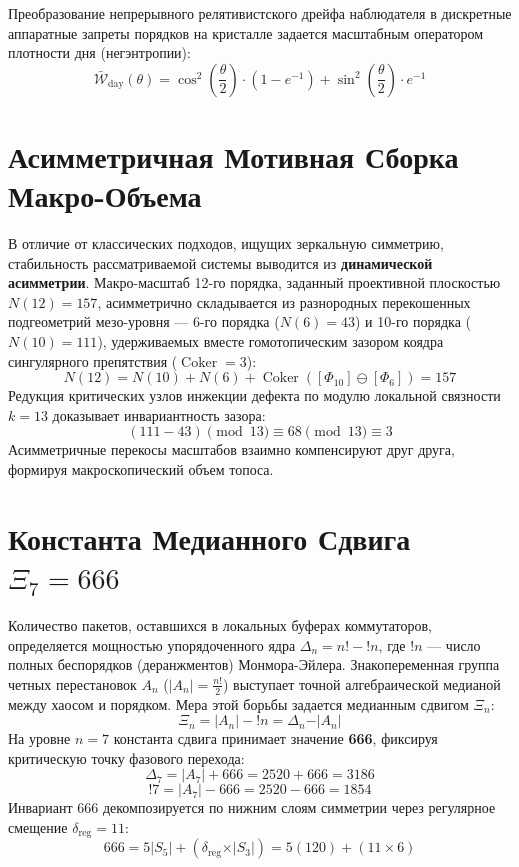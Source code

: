 \documentclass[10pt,twocolumn]{article}
\DeclareMathOperator{\Coker}{Coker}
\begin{document}
Преобразование непрерывного релятивистского дрейфа наблюдателя в дискретные аппаратные запреты порядков на кристалле задается масштабным оператором плотности дня (негэнтропии):
\begin{equation}
\bar{\mathcal{W}}_{\text{day}}(\theta) = \cos^2\left(\frac{\theta}{2}\right) \cdot (1 - e^{-1}) + \sin^2\left(\frac{\theta}{2}\right) \cdot e^{-1}
\end{equation}

\section{Асимметричная Мотивная Сборка Макро-Объема}
В отличие от классических подходов, ищущих зеркальную симметрию, стабильность рассматриваемой системы выводится из \textbf{динамической асимметрии}. Макро-масштаб 12-го порядка, заданный проективной плоскостью $N(12) = 157$, асимметрично складывается из разнородных перекошенных подгеометрий мезо-уровня — 6-го порядка ($N(6) = 43$) и 10-го порядка ($N(10) = 111$), удерживаемых вместе гомотопическим зазором коядра сингулярного препятствия ($\Coker = 3$):
\begin{equation}
N(12) = N(10) + N(6) + \Coker\left([\Phi_{10}] \ominus [\Phi_{6}]\right) = 157
\end{equation}
Редукция критических узлов инжекции дефекта по модулю локальной связности $k=13$ доказывает инвариантность зазора:
\begin{equation}
(111 - 43) \pmod{13} \equiv 68 \pmod{13} \equiv 3
\end{equation}
Асимметричные перекосы масштабов взаимно компенсируют друг друга, формируя макроскопический объем топоса.

\section{Константа Медианного Сдвига $\Xi_7 = 666$}
Количество пакетов, оставшихся в локальных буферах коммутаторов, определяется мощностью упорядоченного ядра $\Delta_n = n! - !n$, где $!n$ — число полных беспорядков (деранжментов) Монмора-Эйлера. Знакопеременная группа четных перестановок $A_n$ ($\vert A_n \vert = \frac{n!}{2}$) выступает точной алгебраической медианой между хаосом и порядком. Мера этой борьбы задается медианным сдвигом $\Xi_n$:
\begin{equation}
\Xi_n = \vert A_n \vert - !n = \Delta_n - \vert A_n \vert
\end{equation}
На уровне $n=7$ константа сдвига принимает значение \textbf{666}, фиксируя критическую точку фазового перехода:
\begin{equation}
\Delta_7 = \vert A_7 \vert + 666 = 2520 + 666 = 3186
\end{equation}
\begin{equation}
!7 = \vert A_7 \vert - 666 = 2520 - 666 = 1854
\end{equation}
Инвариант $666$ декомпозируется по нижним слоям симметрии через регулярное смещение $\delta_{\text{reg}} = 11$:
\begin{equation}
666 = 5\vert S_5 \vert + (\delta_{\text{reg}} \times \vert S_3 \vert) = 5(120) + (11 \times 6)
\end{equation}
\end{document}
